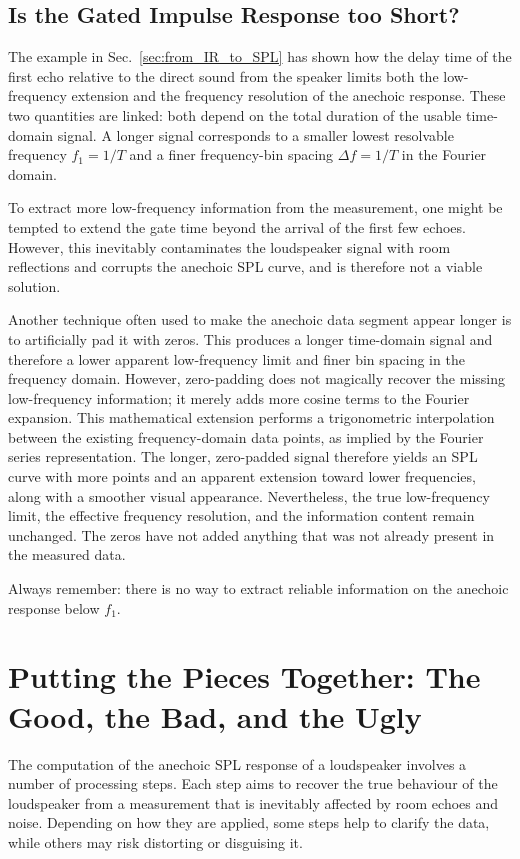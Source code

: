 \documentclass[12pt,a4paper]{article}
\providecommand{\seclabel}[1]{\label{sec:#1}}
\providecommand{\secn}[1]{Sec.~\ref{sec:#1}}
\begin{document}
\subsection{Is the Gated Impulse Response too Short?}\seclabel{zeropadding}

The example in \secn{from_IR_to_SPL} has shown how the delay time of the first echo relative to the direct sound from the speaker limits both the low-frequency extension and the frequency resolution of the anechoic response. These two quantities are linked: both depend on the total duration of the usable time-domain signal. A longer signal corresponds to a smaller lowest resolvable frequency $f_1 = 1/T$ and a finer frequency-bin spacing $\Delta f = 1/T$ in the Fourier domain.

To extract more low-frequency information from the measurement, one might be tempted to extend the gate time beyond the arrival of the first few echoes. However, this inevitably contaminates the loudspeaker signal with room reflections and corrupts the anechoic SPL curve, and is therefore not a viable solution.

Another technique often used to make the anechoic data segment appear longer is to artificially pad it with zeros. This produces a longer time-domain signal and therefore a lower apparent low-frequency limit and finer bin spacing in the frequency domain. However, zero-padding does not magically recover the missing low-frequency information; it merely adds more cosine terms to the Fourier expansion. This mathematical extension performs a trigonometric interpolation between the existing frequency-domain data points, as implied by the Fourier series representation. The longer, zero-padded signal therefore yields an SPL curve with more points and an apparent extension toward lower frequencies, along with a smoother visual appearance. Nevertheless, the true low-frequency limit, the effective frequency resolution, and the information content remain unchanged. The zeros have not added anything that was not already present in the measured data.

Always remember: there is no way to extract reliable information on the anechoic response below $f_1$.


\section{Putting the Pieces Together: The Good, the Bad, and the Ugly}\seclabel{putting_pieces_together}

The computation of the anechoic SPL response of a loudspeaker involves a number of processing steps. Each step aims to recover the true behaviour of the loudspeaker from a measurement that is inevitably affected by room echoes and noise. Depending on how they are applied, some steps help to clarify the data, while others may risk distorting or disguising it.
\end{document}
